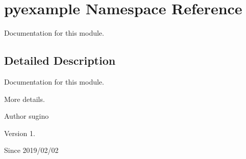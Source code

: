 \hypertarget{namespacepyexample}{}\section{pyexample Namespace Reference}
\label{namespacepyexample}


Documentation for this module.  




\subsection{Detailed Description}
Documentation for this module. 

More details. \begin{DoxyAuthor}{Author}
sugino 
\end{DoxyAuthor}
\begin{DoxyVersion}{Version}
1. 
\end{DoxyVersion}
\begin{DoxySince}{Since}
2019/02/02 
\end{DoxySince}
